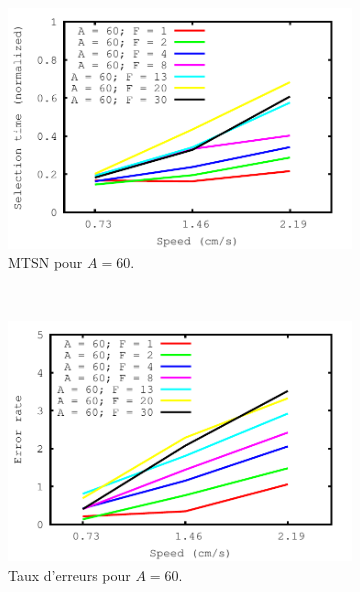 	\newcommand{\subImgWlineplot}{0.48\textwidth}
	\begin{figure}[!htb]
		\centering
		\begin{subfigure}[t]{\subImgWlineplot}
			\centering
			\includegraphics[width=\textwidth]{figures/ch4/speed_angle_60_times}
			\caption{MTSN pour $A = 60$.}
			\label{fig:spEffect_t_60}
		\end{subfigure}
		~
		\begin{subfigure}[t]{\subImgWlineplot}
			\centering
			\includegraphics[width=\textwidth]{figures/ch4/speed_angle_60_errors}
			\caption{Taux d'erreurs pour $A = 60$.}
			\label{fig:spEffect_e_60}
		\end{subfigure}
		~
		\begin{subfigure}[t]{\subImgWlineplot}
			\centering

\end{subfigure}
\end{figure}
